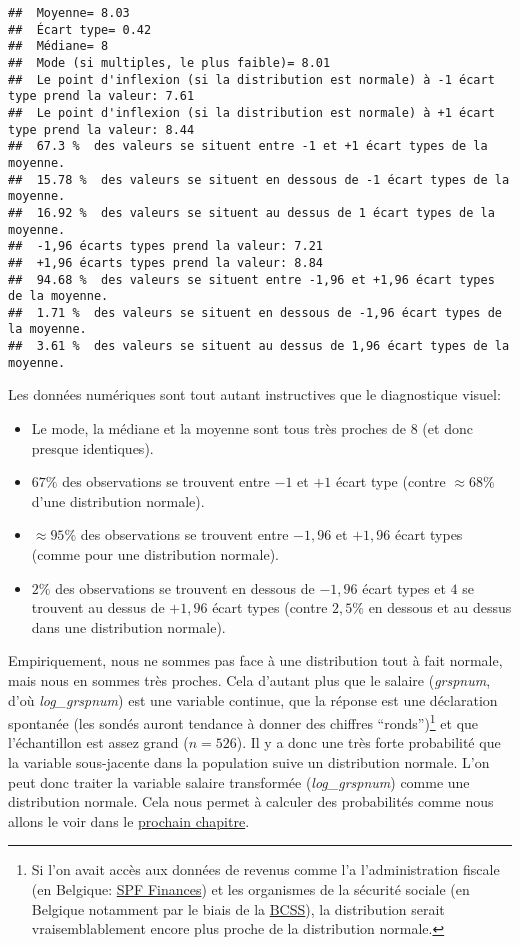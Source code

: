 \documentclass[
]{book}
\providecommand{\tightlist}{%
  \setlength{\itemsep}{0pt}\setlength{\parskip}{0pt}}
\begin{document}
\begin{verbatim}
##  Moyenne= 8.03 
##  Écart type= 0.42 
##  Médiane= 8 
##  Mode (si multiples, le plus faible)= 8.01 
##  Le point d'inflexion (si la distribution est normale) à -1 écart type prend la valeur: 7.61 
##  Le point d'inflexion (si la distribution est normale) à +1 écart type prend la valeur: 8.44 
##  67.3 %  des valeurs se situent entre -1 et +1 écart types de la moyenne. 
##  15.78 %  des valeurs se situent en dessous de -1 écart types de la moyenne. 
##  16.92 %  des valeurs se situent au dessus de 1 écart types de la moyenne. 
##  -1,96 écarts types prend la valeur: 7.21 
##  +1,96 écarts types prend la valeur: 8.84 
##  94.68 %  des valeurs se situent entre -1,96 et +1,96 écart types de la moyenne. 
##  1.71 %  des valeurs se situent en dessous de -1,96 écart types de la moyenne. 
##  3.61 %  des valeurs se situent au dessus de 1,96 écart types de la moyenne.
\end{verbatim}

Les données numériques sont tout autant instructives que le diagnostique visuel:

\begin{itemize}
\tightlist
\item
  Le mode, la médiane et la moyenne sont tous très proches de \(8\) (et donc presque identiques).
\item
  \(67\%\) des observations se trouvent entre \(-1\) et \(+1\) écart type (contre \(\approx68\%\) d'une distribution normale).
\item
  \(\approx95\%\) des observations se trouvent entre \(-1,96\) et \(+1,96\) écart types (comme pour une distribution normale).
\item
  \(2\%\) des observations se trouvent en dessous de \(-1,96\) écart types et \(4%
  \) se trouvent au dessus de \(+1,96\) écart types (contre \(2,5\%\) en dessous et au dessus dans une distribution normale).
\end{itemize}

Empiriquement, nous ne sommes pas face à une distribution tout à fait normale, mais nous en sommes très proches. Cela d'autant plus que le salaire (\emph{grspnum}, d'où \emph{log\_grspnum}) est une variable continue, que la réponse est une déclaration spontanée (les sondés auront tendance à donner des chiffres ``ronds'')\footnote{Si l'on avait accès aux données de revenus comme l'a l'administration fiscale (en Belgique: \href{https://finances.belgium.be/fr}{SPF Finances}) et les organismes de la sécurité sociale (en Belgique notamment par le biais de la \href{https://www.ksz-bcss.fgov.be/fr}{BCSS}), la distribution serait vraisemblablement encore plus proche de la distribution normale.} et que l'échantillon est assez grand (\(n=526\)). Il y a donc une très forte probabilité que la variable sous-jacente dans la population suive un distribution normale. L'on peut donc traiter la variable salaire transformée (\emph{log\_grspnum}) comme une distribution normale. Cela nous permet à calculer des probabilités comme nous allons le voir dans le \protect\hyperlink{distribution_normale_proba}{prochain chapitre}.
\end{document}
